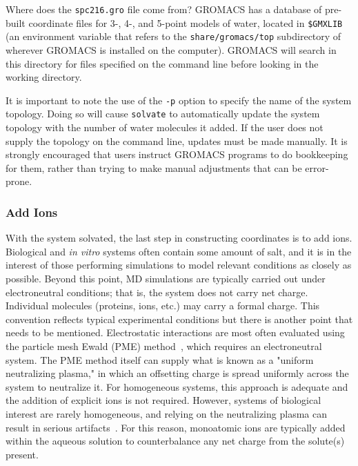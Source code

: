 \documentclass[9pt,tutorial,pubversion]{livecoms}
\begin{document}
Where does the \texttt{spc216.gro} file come from? GROMACS has a database of pre-built coordinate files for 3-, 4-, and 5-point models of water, located in \texttt{\$GMXLIB} (an environment variable that refers to the \texttt{share/gromacs/top} subdirectory of wherever GROMACS is installed on the computer). GROMACS will search in this directory for files specified on the command line before looking in the working directory.

It is important to note the use of the \texttt{-p} option to specify the name of the system topology. Doing so will cause \texttt{solvate} to automatically update the system topology with the number of water molecules it added. If the user does not supply the topology on the command line, updates must be made manually. It is strongly encouraged that users instruct GROMACS programs to do bookkeeping for them, rather than trying to make manual adjustments that can be error-prone.

\subsubsection{Add Ions} \label{lyso_ions}

With the system solvated, the last step in constructing coordinates is to add ions. Biological and {\em in vitro} systems often contain some amount of salt, and it is in the interest of those performing simulations to model relevant conditions as closely as possible. Beyond this point, MD simulations are typically carried out under electroneutral conditions; that is, the system does not carry net charge. Individual molecules (proteins, ions, etc.) may carry a formal charge. This convention reflects typical experimental conditions but there is another point that needs to be mentioned. Electrostatic interactions are most often evaluated using the particle mesh Ewald (PME) method~\cite{Darden1993,Essmann1995}, which requires an electroneutral system. The PME method itself can supply what is known as a "uniform neutralizing plasma," in which an offsetting charge is spread uniformly across the system to neutralize it. For homogeneous systems, this approach is adequate and the addition of explicit ions is not required. However, systems of biological interest are rarely homogeneous, and relying on the neutralizing plasma can result in serious artifacts~\cite{Hub2014}. For this reason, monoatomic ions are typically added within the aqueous solution to counterbalance any net charge from the solute(s) present.
\end{document}
